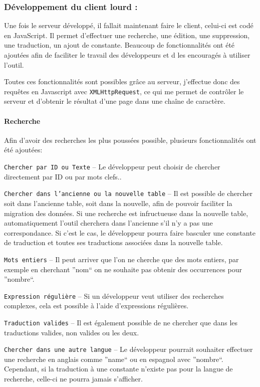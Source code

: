         \subsubsection{Développement du client lourd : \mlanguage{}}
        Une fois le serveur développé, il fallait maintenant faire le client, celui-ci est codé en JavaScript. Il permet d'effectuer une recherche, une édition, une suppression, une traduction, un ajout de constante. Beaucoup de fonctionnalités ont été ajoutées afin de faciliter le travail des développeurs et d les encouragés à utiliser l'outil.

        Toutes ces fonctionnalités sont possibles grâce au serveur, j'effectue donc des requêtes en Javascript avec \texttt{XMLHttpRequest}, ce qui me permet de contrôler le serveur et d'obtenir le résultat d'une page dans une chaîne de caractère.

        \paragraph{Recherche}
            Afin d'avoir des recherches les plus poussées possible, plusieurs fonctionnalités ont été ajoutées:

            \texttt{Chercher par ID ou Texte} -- Le développeur peut choisir de chercher directement par ID ou par mots clefs..

            \texttt{Chercher dans l'ancienne ou la nouvelle table} -- Il est possible de chercher soit dans l'ancienne table, soit dans la nouvelle, afin de pouvoir faciliter la migration des données. Si une recherche est infructueuse dans la nouvelle table, automatiquement l'outil cherchera dans l'ancienne s'il n'y a pas une correspondance. Si c'est le cas, le développeur pourra faire basculer une constante de traduction et toutes ses traductions associées dans la nouvelle table.

            \texttt{Mots entiers} -- Il peut arriver que l'on ne cherche que des mots entiers, par exemple en cherchant ''nom`` on ne souhaite pas obtenir des occurrences pour ''nombre``.

            \texttt{Expression régulière} -- Si un développeur veut utiliser des recherches complexes, cela est possible à l'aide d'expressions régulières.

            \texttt{Traduction valides} -- Il est également possible de ne chercher que dans les traductions valides, non valides ou les deux.

            \texttt{Chercher dans une autre langue} -- Le développeur pourrait souhaiter effectuer une recherche en anglais comme ''name`` ou en espagnol avec ''nombre``. Cependant, si la traduction à une constante n'existe pas pour la langue de recherche, celle-ci ne pourra jamais s'afficher.

